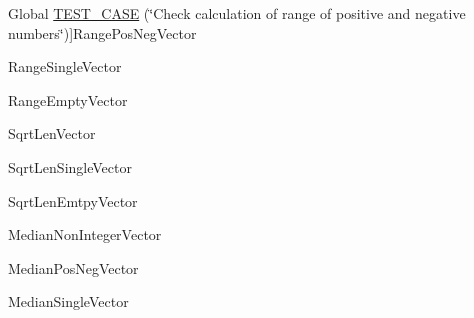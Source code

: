 \begin{DoxyRefList}
%
Global \mbox{\hyperlink{testMetrics_8cpp_ad5e0fee1e778479d616f9db505b1604c}{T\+E\+S\+T\+\_\+\+C\+A\+SE}} (\char`\"{}\+Check calculation of range of positive and negative numbers\char`\"{})]Range\+Pos\+Neg\+Vector  
\item[\label{test__test000020}%
\Hypertarget{test__test000020}%
Global \mbox{\hyperlink{testMetrics_8cpp_a9a1728a8603b5d5d93d66958e3edac07}{T\+E\+S\+T\+\_\+\+C\+A\+SE}} (\char`\"{}\+Check calculation of range of singularly occupied vector\char`\"{})]Range\+Single\+Vector  
\item[\label{test__test000019}%
\Hypertarget{test__test000019}%
Global \mbox{\hyperlink{testMetrics_8cpp_ae4e75ab4f6bbf2508894636e864ca5fa}{T\+E\+S\+T\+\_\+\+C\+A\+SE}} (\char`\"{}\+Check range of empty vector\char`\"{})]Range\+Empty\+Vector  
\item[\label{test__test000018}%
\Hypertarget{test__test000018}%
Global \mbox{\hyperlink{testMetrics_8cpp_aa08764ae97194a58f3e0538a50508789}{T\+E\+S\+T\+\_\+\+C\+A\+SE}} (\char`\"{}\+Check sqrt\+Len of longer vector\char`\"{})]Sqrt\+Len\+Vector  
\item[\label{test__test000017}%
\Hypertarget{test__test000017}%
Global \mbox{\hyperlink{testMetrics_8cpp_a74f6b459e9d50d4dd61636b961375d23}{T\+E\+S\+T\+\_\+\+C\+A\+SE}} (\char`\"{}\+Check sqrt\+Len of singularly occupied vector\char`\"{})]Sqrt\+Len\+Single\+Vector  
\item[\label{test__test000016}%
\Hypertarget{test__test000016}%
Global \mbox{\hyperlink{testMetrics_8cpp_af8ddf1c9d577df4c55c09fe60559d54b}{T\+E\+S\+T\+\_\+\+C\+A\+SE}} (\char`\"{}\+Check sqrt\+Len of empty vector\char`\"{})]Sqrt\+Len\+Emtpy\+Vector  
\item[\label{test__test000015}%
\Hypertarget{test__test000015}%
Global \mbox{\hyperlink{testMetrics_8cpp_ab70630a1c4e94d345bb446540949dd49}{T\+E\+S\+T\+\_\+\+C\+A\+SE}} (\char`\"{}\+Check calculation of median of non-\/integer reals\char`\"{})]Median\+Non\+Integer\+Vector  
\item[\label{test__test000014}%
\Hypertarget{test__test000014}%
Global \mbox{\hyperlink{testMetrics_8cpp_a7551e1fd55f4618e1cc92780505b3a6b}{T\+E\+S\+T\+\_\+\+C\+A\+SE}} (\char`\"{}\+Check calculation of median of positive and negative numbers\char`\"{})]Median\+Pos\+Neg\+Vector  
\item[\label{test__test000013}%
\Hypertarget{test__test000013}%
Global \mbox{\hyperlink{testMetrics_8cpp_abd0df56b26da56246dade8d85f0087d5}{T\+E\+S\+T\+\_\+\+C\+A\+SE}} (\char`\"{}\+Check calculation of median of singularly occupied vector\char`\"{})]Median\+Single\+Vector  

\end{DoxyRefList}
